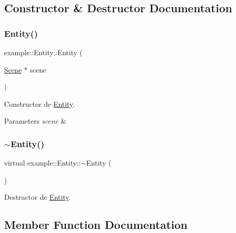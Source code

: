 \subsection{Constructor \& Destructor Documentation}
\mbox{\label{classexample_1_1_entity_aa2154c66b8b0142ef510137bb67e643b}} 
\subsubsection{\texorpdfstring{Entity()}{Entity()}}
{\footnotesize\ttfamily example\+::\+Entity\+::\+Entity (\begin{DoxyParamCaption}\item[{\mbox{\hyperlink{classexample_1_1_scene}{Scene}} $\ast$}]{scene }\end{DoxyParamCaption})}



Constructor de \mbox{\hyperlink{classexample_1_1_entity}{Entity}}. 


\begin{DoxyParams}{Parameters}
{\em scene} & \\
\hline
\end{DoxyParams}
\mbox{\label{classexample_1_1_entity_a7ad532833fe996de3a728570b70a2c1d}} 
\subsubsection{\texorpdfstring{$\sim$Entity()}{~Entity()}}
{\footnotesize\ttfamily virtual example\+::\+Entity\+::$\sim$\+Entity (\begin{DoxyParamCaption}{ }\end{DoxyParamCaption})\hspace{0.3cm}{\ttfamily [virtual]}}



Destructor de \mbox{\hyperlink{classexample_1_1_entity}{Entity}}. 



\subsection{Member Function Documentation}
\mbox{\label{classexample_1_1_entity_a09f6836192c2f8bce91a7b4f6934b94e}} 
